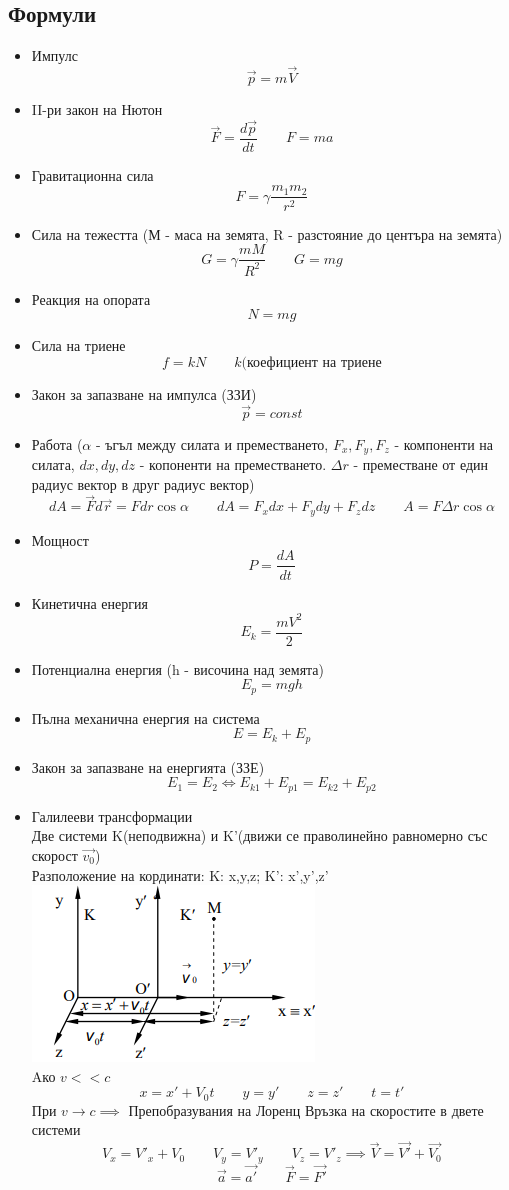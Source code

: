 \documentclass[fleqn, 12pt]{article}
\theoremstyle{definition}
\begin{document}
\subsection{Формули}
\begin{itemize}
\item Импулс
$$\vec{p} = m \vec{V}$$
\item II-ри закон на Нютон
$$\vec{F} = \frac{d \vec{p}}{dt} \qquad F= ma$$
\item Гравитационна сила
$$F = \gamma \frac{m_1 m_2}{r^2}$$
\item Сила на тежестта (М - маса на земята, R - разстояние до центъра на земята)
$$G = \gamma \frac{mM}{R^2} \qquad G = mg$$
\item Реакция на опората
$$N = mg$$
\item Сила на триене
$$f = kN \qquad k(\text{коефициент на триене}$$
\item Закон за запазване на импулса (ЗЗИ) 
$$\vec{p} = const$$
\item Работа ($\alpha$ - ъгъл между силата и преместването, $F_x, F_y, F_z$ - компоненти на силата, $dx,dy,dz$ - копоненти на преместването. $\Delta r$ - преместване от един радиус вектор в друг радиус вектор)
$$dA = \vec{F} d\vec{r} = F dr \cos \alpha \qquad dA = F_x dx + F_y dy + F_z dz \qquad A = F \Delta r \cos \alpha$$
\item Мощност 
$$P = \frac{dA}{dt}$$
\item Кинетична енергия 
$$E_k = \frac{mV^2}{2}$$
\item Потенциална енергия (h - височина над земята)
$$E_p = mgh$$
\item Пълна механична енергия на система
$$E = E_k + E_p$$
\item Закон за запазване на енергията (ЗЗЕ)
$$E_1 = E_2 \Leftrightarrow E_{k1} + E_{p1} = E_{k2} + E_{p2}$$
\item Галилееви трансформации \\
Две системи K(неподвижна) и K'(движи се праволинейно равномерно със скорост $\vec{v_0}$) \\
Разположение на кординати: K: x,y,z; K': x',y',z' \\
\includegraphics{Pics/physics/lec2-1.png} \\
Aко $v << c$
$$x = x' + V_0t \qquad y = y' \qquad z = z' \qquad t = t'$$
При $v \to c \implies$ Препобразувания на Лоренц
Връзка на скоростите в двете системи
$$V_x = V'_x + V_0 \qquad V_y = V'_y  \qquad  V_z = V'_z \implies \vec{V} = \vec{V'} + \vec{V_0}$$
$$\vec{a} = \vec{a'} \qquad \vec{F} = \vec{F'}$$
\end{itemize} 
\newpage
\end{document}
